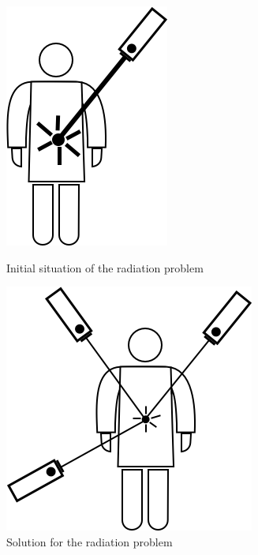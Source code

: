 \documentclass[12pt]{article}
\begin{document}
\begin{figure}[H]
    \centering
    \begin{minipage}[b]{0.45\textwidth}
    	\includegraphics[scale=0.4]{images/laser_1.png}
    	\centering
    	\caption{Initial situation of the radiation problem}
    	\label{fig:radiation_problem}
    \end{minipage}
    \hfill
    \begin{minipage}[b]{0.45\textwidth}
    	\includegraphics[scale=0.4]{images/laser_2.png}
    	\centering
    	\caption{Solution for the radiation problem}
    	\label{fig:radiation_solution}
    \end{minipage}
\end{figure}
\end{document}
